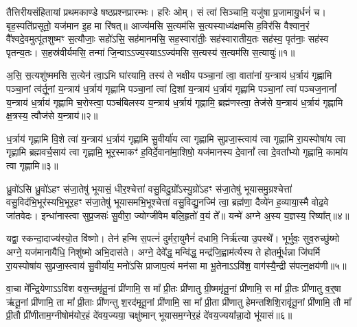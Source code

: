 {\anuvakamend[{दिवा॒ स स॑ह॒स्रिणं॒ वैश्वा॑नरा\-ऽ\-ऽदित्य॒ तू नो॑\-ऽने॒हसꣳ॑ सु॒शर्मा॑ण॒मेका॒न्नविꣳ॑श॒तिश्च॑॥11॥}]}

\setcounter{anuvakam}{0}
तैत्तिरीयसंहितायां प्रथमकाण्डे षष्ठप्रश्नप्रारम्भः। हरिः ओम्। सं त्वा॑ सिञ्चामि॒ यजु॑षा प्र॒जामायु॒र्धनं॑ च। बृह॒स्पति॑प्रसूतो॒ यज॑मान इ॒ह मा रि॑षत्॥ आज्य॑मसि स॒त्यम॑सि स॒त्यस्याध्य॑क्षमसि ह॒विर॑सि वैश्वान॒रं वै᳚श्वदे॒वमुत्पू॑तशुष्मꣳ स॒त्यौजाः॒ सहो॑\-ऽसि॒ सह॑मानमसि॒ सह॒स्वारा॑तीः॒ सह॑स्वारातीय॒तः सह॑स्व॒ पृत॑नाः॒ सह॑स्व पृतन्य॒तः। स॒हस्र॑वीर्यमसि॒ तन्मा॑ जि॒न्वा\-ऽ\-ऽज्य॒स्या\-ऽ\-ऽज्य॑मसि स॒त्यस्य॑ स॒त्यम॑सि स॒त्यायुः॑॥१॥

अ॒सि॒ स॒त्यशु॑ष्ममसि स॒त्येन॑ त्वा॒\-ऽभि घा॑रयामि॒ तस्य॑ ते भक्षीय पञ्चा॒नां त्वा॒ वाता॑नां य॒न्त्राय॑ ध॒र्त्राय॑ गृह्णामि पञ्चा॒नां त्व॑र्तू॒नां य॒न्त्राय॑ ध॒र्त्राय॑ गृह्णामि पञ्चा॒नां त्वा॑ दि॒शां य॒न्त्राय॑ ध॒र्त्राय॑ गृह्णामि पञ्चा॒नां त्वा॑ पञ्चज॒नानां᳚ य॒न्त्राय॑ ध॒र्त्राय॑ गृह्णामि च॒रोस्त्वा॒ पञ्च॑बिलस्य य॒न्त्राय॑ ध॒र्त्राय॑ गृह्णामि॒ ब्रह्म॑णस्त्वा॒ तेज॑से य॒न्त्राय॑ ध॒र्त्राय॑ गृह्णामि क्ष॒त्रस्य॒ त्वौज॑से य॒न्त्राय॑॥२॥

ध॒र्त्राय॑ गृह्णामि वि॒शे त्वा॑ य॒न्त्राय॑ ध॒र्त्राय॑ गृह्णामि सु॒वीर्या॑य त्वा गृह्णामि सुप्रजा॒स्त्वाय॑ त्वा गृह्णामि रा॒यस्पोषा॑य त्वा गृह्णामि ब्रह्मवर्च॒साय॑ त्वा गृह्णामि॒ भूर॒स्माकꣳ॑ ह॒विर्दे॒वाना॑मा॒शिषो॒ यज॑मानस्य दे॒वानां᳚ त्वा दे॒वता᳚भ्यो गृह्णामि॒ कामा॑य त्वा गृह्णामि॥३॥

{\anuvakamend[{स॒त्यायु॒रोज॑से य॒न्त्राय॒ त्रय॑स्त्रिꣳशच्च॥१॥}]}

ध्रु॒वो॑\-ऽसि ध्रु॒वो॑\-ऽहꣳ स॑जा॒तेषु॑ भूयासं॒ धीर॒श्चेत्ता॑ वसु॒विदु॒ग्रो᳚\-ऽस्यु॒ग्रो॑\-ऽहꣳ स॑जा॒तेषु॑ भूयासमु॒ग्रश्चेत्ता॑ वसु॒विद॑भि॒भूर॑स्यभि॒भूर॒हꣳ स॑जा॒तेषु॑ भूयासमभि॒भूश्चेत्ता॑ वसु॒विद्यु॒नज्मि॑ त्वा॒ ब्रह्म॑णा॒ दैव्ये॑न ह॒व्याया॒स्मै वोढ॒वे जा॑तवेदः। इन्धा॑नास्त्वा सुप्र॒जसः॑ सु॒वीरा॒ ज्योग्जी॑वेम बलि॒हृतो॑ व॒यं ते᳚॥ यन्मे॑ अग्ने अ॒स्य य॒ज्ञस्य॒ रिष्या᳚त्॥४॥

यद्वा॒ स्कन्दा॒दाज्य॑स्यो॒त वि॑ष्णो। तेन॑ हन्मि स॒पत्नं॑ दुर्मरा॒युमैनं॑ दधामि॒ निर्\mbox{}ऋ॑त्या उ॒पस्थे᳚। भूर्भुवः॒ सुव॒रुच्छु॑ष्मो अग्ने॒ यज॑मानायैधि॒ निशु॑ष्मो अभि॒दास॑ते। अग्ने॒ देवे᳚द्ध॒ मन्वि॑द्ध॒ मन्द्र॑जि॒ह्वाम॑र्त्यस्य ते होतर्मू॒र्धन्ना जि॑घर्मि रा॒यस्पोषा॑य सुप्रजा॒स्त्वाय॑ सु॒वीर्या॑य॒ मनो॑\-ऽसि प्राजाप॒त्यं मन॑सा मा भू॒तेना\-ऽ\-ऽवि॑श॒ वाग॑स्यै॒न्द्री स॑पत्न॒क्षय॑णी॥५॥

वा॒चा मे᳚न्द्रि॒येणा\-ऽ\-ऽवि॑श वस॒न्तमृ॑तू॒नां प्री॑णामि॒ स मा᳚ प्री॒तः प्री॑णातु ग्री॒ष्ममृ॑तू॒नां प्री॑णामि॒ स मा᳚ प्री॒तः प्री॑णातु व॒र्॒\mbox{}षा ऋ॑तू॒नां प्री॑णामि॒ ता मा᳚ प्री॒ताः प्री॑णन्तु श॒रद॑मृतू॒नां प्री॑णामि॒ सा मा᳚ प्री॒ता प्री॑णातु हेमन्तशिशि॒रावृ॑तू॒नां प्री॑णामि॒ तौ मा᳚ प्री॒तौ प्री॑णीताम॒ग्नीषोम॑योर॒हं दे॑वय॒ज्यया॒ चक्षु॑ष्मान् भूयासम॒ग्नेर॒हं दे॑वय॒ज्यया᳚न्ना॒दो भू॑यासं॥६॥

